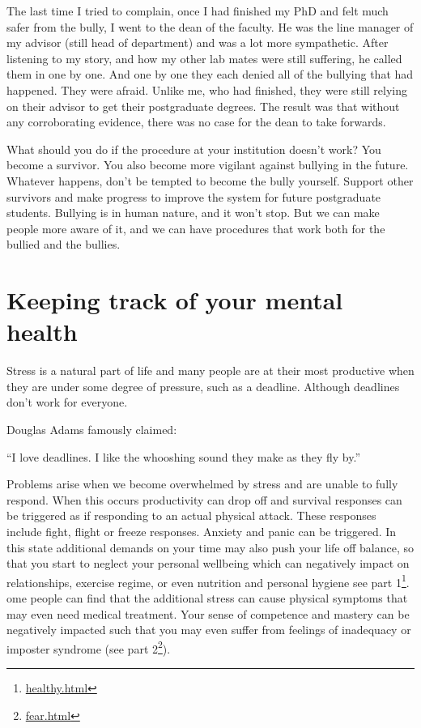 \documentclass[
]{krantz}
\renewenvironment{quote}{\begin{VF}}{\end{VF}}
\renewcommand{\href}[2]{#2\footnote{\url{#1}}}
\begin{document}
The last time I tried to complain, once I had finished my PhD and felt much safer from the bully, I went to the dean of the faculty. He was the line manager of my advisor (still head of department) and was a lot more sympathetic. After listening to my story, and how my other lab mates were still suffering, he called them in one by one. And one by one they each denied all of the bullying that had happened. They were afraid. Unlike me, who had finished, they were still relying on their advisor to get their postgraduate degrees. The result was that without any corroborating evidence, there was no case for the dean to take forwards.

What should you do if the procedure at your institution doesn't work? You become a survivor. You also become more vigilant against bullying in the future. Whatever happens, don't be tempted to become the bully yourself. Support other survivors and make progress to improve the system for future postgraduate students. Bullying is in human nature, and it won't stop. But we can make people more aware of it, and we can have procedures that work both for the bullied and the bullies.

\hypertarget{mentalhealth}{%
\chapter{Keeping track of your mental health}\label{mentalhealth}}

Stress is a natural part of life and many people are at their most productive when they are under some degree of pressure, such as a deadline. Although deadlines don't work for everyone.

\begin{quote}
Douglas Adams famously claimed:
\end{quote}

\begin{quote}
``I love deadlines. I like the whooshing sound they make as they fly by.''
\end{quote}

Problems arise when we become overwhelmed by stress and are unable to fully respond. When this occurs productivity can drop off and survival responses can be triggered as if responding to an actual physical attack. These responses include fight, flight or freeze responses. Anxiety and panic can be triggered. In this state additional demands on your time may also push your life off balance, so that you start to neglect your personal wellbeing which can negatively impact on relationships, exercise regime, or even nutrition and personal hygiene \href{healthy.html}{see part 1}. ome people can find that the additional stress can cause physical symptoms that may even need medical treatment. Your sense of competence and mastery can be negatively impacted such that you may even suffer from feelings of inadequacy or imposter syndrome (\href{fear.html}{see part 2}).
\end{document}
